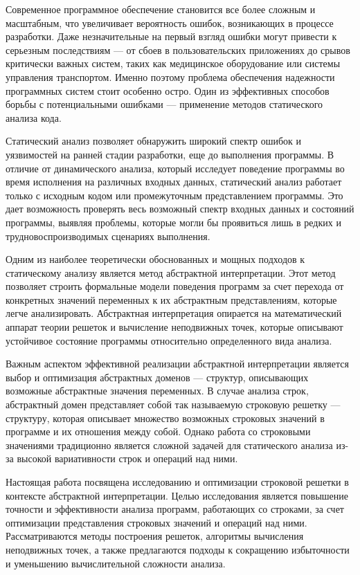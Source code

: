 Современное программное обеспечение становится все более сложным и масштабным, что увеличивает вероятность ошибок, возникающих в процессе разработки. Даже незначительные на первый взгляд ошибки могут привести к серьезным последствиям — от сбоев в пользовательских приложениях до срывов критически важных систем, таких как медицинское оборудование или системы управления транспортом. Именно поэтому проблема обеспечения надежности программных систем стоит особенно остро. Один из эффективных способов борьбы с потенциальными ошибками — применение методов статического анализа кода.

Статический анализ позволяет обнаружить широкий спектр ошибок и уязвимостей на ранней стадии разработки, еще до выполнения программы. В отличие от динамического анализа, который исследует поведение программы во время исполнения на различных входных данных, статический анализ работает только с исходным кодом или промежуточным представлением программы. Это дает возможность проверять весь возможный спектр входных данных и состояний программы, выявляя проблемы, которые могли бы проявиться лишь в редких и трудновоспроизводимых сценариях выполнения.

Одним из наиболее теоретически обоснованных и мощных подходов к статическому анализу является метод абстрактной интерпретации. Этот метод позволяет строить формальные модели поведения программ за счет перехода от конкретных значений переменных к их абстрактным представлениям, которые легче анализировать. Абстрактная интерпретация опирается на математический аппарат теории решеток и вычисление неподвижных точек, которые описывают устойчивое состояние программы относительно определенного вида анализа.

Важным аспектом эффективной реализации абстрактной интерпретации является выбор и оптимизация абстрактных доменов — структур, описывающих возможные абстрактные значения переменных. В случае анализа строк, абстрактный домен представляет собой так называемую строковую решетку — структуру, которая описывает множество возможных строковых значений в программе и их отношения между собой. Однако работа со строковыми значениями традиционно является сложной задачей для статического анализа из-за высокой вариативности строк и операций над ними.

Настоящая работа посвящена исследованию и оптимизации строковой решетки в контексте абстрактной интерпретации. Целью исследования является повышение точности и эффективности анализа программ, работающих со строками, за счет оптимизации представления строковых значений и операций над ними. Рассматриваются методы построения решеток, алгоритмы вычисления неподвижных точек, а также предлагаются подходы к сокращению избыточности и уменьшению вычислительной сложности анализа.

